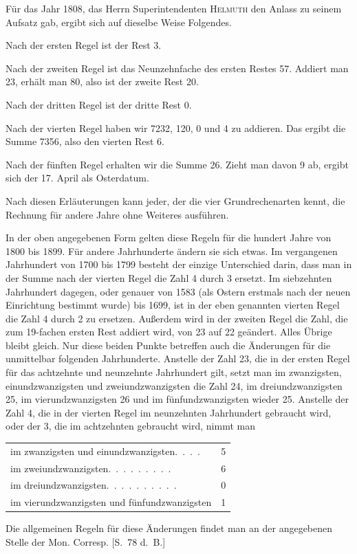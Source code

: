 Für das Jahr 1808, das Herrn Superintendenten \textsc{Helmuth} den Anlass zu seinem Aufsatz gab, ergibt sich auf dieselbe Weise Folgendes.

Nach der ersten Regel ist der Rest 3.

Nach der zweiten Regel ist das Neunzehnfache des ersten Restes 57. Addiert man 23, erhält man 80, also ist der zweite Rest 20.

Nach der dritten Regel ist der dritte Rest 0.

Nach der vierten Regel haben wir 7232, 120, 0 und 4 zu addieren. Das ergibt die Summe 7356, also den vierten Rest 6.

Nach der fünften Regel erhalten wir die Summe 26. Zieht man davon 9 ab, ergibt sich der 17. April als Osterdatum.

Nach diesen Erläuterungen kann jeder, der die vier Grundrechenarten kennt, die Rechnung für andere Jahre ohne Weiteres ausführen.

In der oben angegebenen Form gelten diese Regeln für die hundert Jahre von 1800 bis 1899. Für andere Jahrhunderte ändern sie sich etwas. Im vergangenen Jahrhundert von 1700 bis 1799 besteht der einzige Unterschied darin, dass man in der Summe nach der vierten Regel die Zahl 4 durch 3 ersetzt. Im siebzehnten Jahrhundert dagegen, oder genauer von 1583 (als Ostern erstmals nach der neuen Einrichtung bestimmt wurde) bis 1699, ist in der eben genannten vierten Regel die Zahl 4 durch 2 zu ersetzen. Außerdem wird in der zweiten Regel die Zahl, die zum 19-fachen ersten Rest addiert wird, von 23 auf 22 geändert. Alles Übrige bleibt gleich. Nur diese beiden Punkte betreffen auch die Änderungen für die unmittelbar folgenden Jahrhunderte. Anstelle der Zahl 23, die in der %
%
ersten Regel für das achtzehnte und neunzehnte Jahrhundert gilt, setzt man im zwanzigsten, einundzwanzigsten und zweiundzwanzigsten die Zahl 24, im dreiundzwanzigsten 25, im vierundzwanzigsten 26 und im fünfundzwanzigsten wieder 25. Anstelle der Zahl 4, die in der vierten Regel im neunzehnten Jahrhundert gebraucht wird, oder der 3, die im achtzehnten gebraucht wird, nimmt man
\begin{center}\small
\begin{tabular}{lr}
im zwanzigsten und einundzwanzigsten\quad .\ .\ .\ . &5\\
im zweiundzwanzigsten\quad .\ .\ .\ .\ .\ .\ .\ .\ . &6\\
im dreiundzwanzigsten\quad .\ .\ .\ .\ .\ .\ .\ .\ .\ . &0\\
im vierundzwanzigsten und fünfundzwanzigsten &1
\end{tabular}
\end{center}
Die allgemeinen Regeln für diese Änderungen findet man an der angegebenen Stelle der Mon. Corresp. [S.~78 d.~B.]

